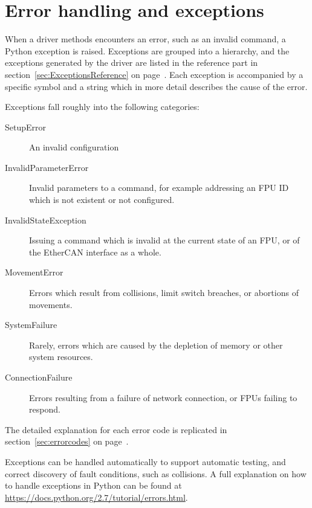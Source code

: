 \documentclass[11pt,a4paper]{scrartcl}
\begin{document}
\section{Error handling and exceptions}
\label{sec:errorhandling}
When a driver methods encounters an error, such as an invalid command,
a Python exception is raised. Exceptions are grouped into a hierarchy,
and the exceptions generated by the driver are listed in the reference
part in section~\ref{sec:ExceptionsReference} on
page~\pageref{sec:ExceptionsReference}. Each exception is accompanied
by a specific symbol and a string which in more detail describes the
cause of the error.

Exceptions fall roughly into the following categories:

\begin{description}
  \item[SetupError] An invalid configuration 
  \item[InvalidParameterError] Invalid parameters to a command, for example addressing an FPU
    ID which is not existent or not configured.
  \item[InvalidStateException] Issuing a command which is invalid at the current state of
    an FPU, or of the EtherCAN interface as a whole.
  \item[MovementError] Errors which result from collisions, limit switch breaches,
    or abortions of movements.
  \item[SystemFailure] Rarely, errors which are caused by the depletion of memory
    or other system resources.
  \item[ConnectionFailure] Errors resulting from a failure of network connection, or FPUs failing to respond.
\end{description}

The detailed explanation for each error code is replicated in
section~\ref{sec:errorcodes} on page~\pageref{sec:errorcodes}.

Exceptions can be handled automatically to support automatic
testing, and correct discovery of fault conditions, such as
collisions. A full explanation on how to handle exceptions in Python can
be found at \url{https://docs.python.org/2.7/tutorial/errors.html}.
\end{document}
